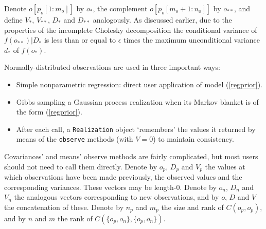 \documentclass{report}
\begin{document}
Denote $o[p_o[1:m_o]]$ by $o_*$, the complement $o[p_o[m_o+1:n_o]]$ by $o_{**}$, and define $V_*$, $V_{**}$, $D_*$ and $D_{**}$ analogously. As discussed earlier, due to the properties of the incomplete Cholesky decomposition the conditional variance of $f(o_{**})|D_*$ is less than or equal to $\epsilon$ times the maximum unconditional variance $d_*$ of $f(o_*)$.

\bigskip
Normally-distributed observations are used in three important ways:
\begin{itemize}
    \item Simple nonparametric regression: direct user application of model (\ref{regprior}).
    \item Gibbs sampling a Gaussian process realization when its Markov blanket \cite{jensen}  is of the form (\ref{regprior}).
    \item After each call, a \texttt{Realization} object `remembers' the values it returned by means of the \texttt{observe} methods (with $V=0$) to maintain consistency.
\end{itemize}

Covariances' and means' observe methods are fairly complicated, but most users should not need to call them directly. Denote by $o_p$, $D_p$ and $V_p$ the values at which observations have been made previously, the observed values and the corresponding variances. These vectors may be length-0. Denote by $o_n$, $D_n$ and $V_n$ the analogous vectors corresponding to new observations, and by $o$, $D$ and $V$ the concatenation of these. Denote by $n_p$ and $m_p$ the size and rank of $C(o_p,o_p)$, and by $n$ and $m$ the rank of $C(\{o_p,o_n\},\{o_p,o_n\})$.
\end{document}
